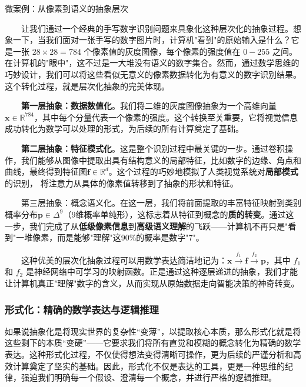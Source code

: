 \begin{microcase}{微案例：从像素到语义的抽象层次}

　　让我们通过一个经典的手写数字识别问题来具象化这种层次化的抽象过程。想象一下，当我们面对一张手写的数字图片时，计算机"看到"的原始输入是什么？它是一张 $28 \times 28 = 784$ 个像素值的灰度图像，每个像素的强度值在 $0-255$ 之间。在计算机的"眼中"，这不过是一大堆没有语义的数字集合。然而，通过数学思维的巧妙设计，我们可以将这些看似无意义的像素数据转化为有意义的数字识别结果。这个转化过程，就是层次化抽象的完美体现。

　　\textbf{第一层抽象：数据数值化}。我们将二维的灰度图像抽象为一个高维向量 $\mathbf{x} \in \mathbb{R}^{784}$，其中每个分量代表一个像素的强度。这个转换至关重要，它将视觉信息成功转化为数学可以处理的形式，为后续的所有计算奠定了基础。

　　\textbf{第二层抽象：特征模式化}。这是整个识别过程中最关键的一步。通过卷积操作，我们能够从图像中提取出具有结构意义的局部特征，比如数字的边缘、角点和曲线，最终得到特征图$\mathbf{f} \in \mathbb{R}^{d}$。这个过程的巧妙地模拟了人类视觉系统对\textbf{局部模式}的识别，
将注意力从具体的像素值转移到了抽象的形状和特征。

　　第三层抽象：概念语义化。在这一层，我们将前面提取的丰富特征映射到类别概率分布$\mathbf{p} \in \Delta^{9}$（9维概率单纯形），这标志着从特征到概念的\textbf{质的转变}。通过这一步，我们完成了从\textbf{低级像素信息}到\textbf{高级语义理解}的飞跃——计算机不再只是"看到"一堆像素，而是能够"理解"这90\%的概率是数字"7"。

　　这种优美的层次化抽象过程可以用数学表达简洁地记为：$\mathbf{x} \xrightarrow{f_1} \mathbf{f} \xrightarrow{f_2} \mathbf{p}$，其中 $f_1$ 和 $f_2$ 是神经网络中可学习的映射函数。正是通过这种逐层递进的抽象，我们才能让计算机真正"理解"数字的含义，从而实现从原始数据走向智能决策的神奇转变。
\end{microcase}

\subsubsection{形式化：精确的数学表达与逻辑推理}

如果说抽象化是将现实世界的复杂性“变薄”，以提取核心本质，那么形式化就是将这些剩下的本质“变硬”——它要求我们将所有直觉和模糊的概念转化为精确的数学表达。这种形式化过程，不仅使得想法变得清晰可操作，更为后续的严谨分析和高效计算奠定了坚实的基础。因此，形式化不仅是表达的工具，更是一种思维的纪律，强迫我们明确每一个假设、澄清每一个概念，并进行严格的逻辑推理。

